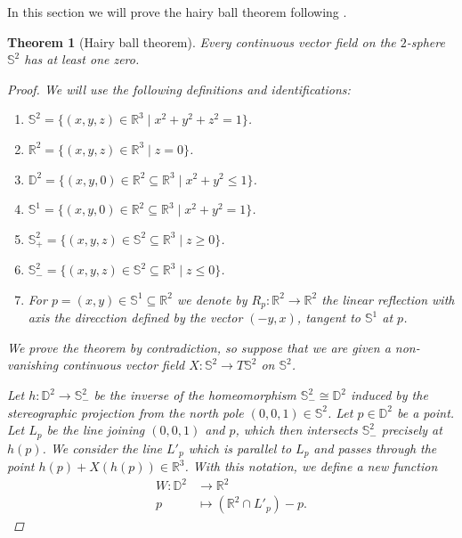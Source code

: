\documentclass[A4paper, 12pt, british, reqno]{amsart}
\newcommand{\bbD}{\mathbb{D}}
\newcommand{\R}{\mathbb{R}} %
\newcommand{\bbS}{\mathbb{S}}
\theoremstyle{plain}
\newtheorem{thm}{Theorem}[section]
\theoremstyle{definition}
\theoremstyle{remark}
\theoremstyle{plain}
\theoremstyle{definition}
\theoremstyle{remark}
\theoremstyle{plain}
\theoremstyle{definition}
\theoremstyle{remark}
\begin{document}
In this section we will prove the hairy ball theorem following \cite{eg79}.

\begin{thm}[Hairy ball theorem]
    Every continuous vector field on the $2$-sphere $\bbS^{2}$ has at least one zero.
    \begin{proof}
	We will use the following definitions and identifications:
	\begin{enumerate}[label=\textbullet]
	    \item $\bbS^{2}=\{ (x,y,z)\in \R^{3}\mid x^{2}+y^{2}+z^{2}=1 \}$.
	    \item $\R^{2}=\{ (x,y,z)\in \R^{3}\mid z=0 \}$.
	    \item $\bbD^{2}=\{ (x,y,0)\in \R^{2}\subseteq \R^{3}\mid x^{2}+y^{2}\leqslant 1 \}$.
	    \item $\bbS^{1}=\{ (x,y,0)\in \R^{2}\subseteq \R^{3}\mid x^{2}+y^{2}=1\}$.
	    \item $\bbS^{2}_{+}=\{ (x,y,z)\in \bbS^{2}\subseteq \R^{3}\mid z\geqslant 0 \}$.
	    \item $\bbS^{2}_{-}=\{ (x,y,z)\in \bbS^{2}\subseteq \R^{3}\mid z\leqslant 0 \}$.
	    \item For $p=(x,y)\in \bbS^{1}\subseteq \R^{2}$ we denote by $R_{p}\colon \R^{2}\to \R^{2}$ the linear reflection with axis the direcction defined by the vector $(-y,x)$, tangent to $\bbS^{1}$ at $p$.
	\end{enumerate}

	We prove the theorem by contradiction, so suppose that we are given a non-vanishing continuous vector field $X\colon \bbS^{2}\to T\bbS^{2}$ on $\bbS^{2}$.

	Let $h\colon \bbD^{2}\to \bbS^{2}_{-}$ be the inverse of the homeomorphism $\bbS^{2}_{-}\cong\bbD^{2}$ induced by the stereographic projection from the north pole $(0,0,1)\in \bbS^{2}$.
	Let $p\in \bbD^{2}$ be a point.
	Let $L_{p}$ be the line joining $(0,0,1)$ and $p$, which then intersects $\bbS^{2}_{-}$ precisely at $h(p)$.
	We consider the line $L'_{p}$ which is parallel to $L_{p}$ and passes through the point $h(p)+X(h(p))\in \R^{3}$.
	With this notation, we define a new function
	\begin{align*}
	    W\colon \bbD^{2} &\longrightarrow \R^{2} \\
	    p & \longmapsto (\R^{2}\cap L'_{p})-p.
	\end{align*}


\end{proof}
\end{thm}
\end{document}
